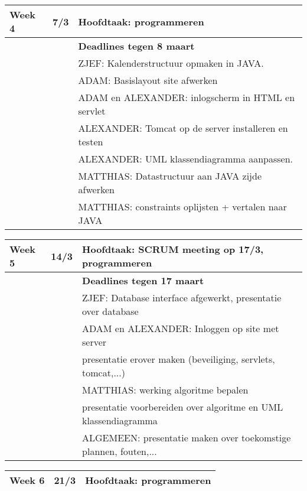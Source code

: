 \documentclass{article}
\begin{document}
\begin{center}
\begin{tabular}[t]{|p{1.3cm}|p{0.8cm}|p{9cm}|}
\hline
Week 4	& 7/3 &	\textbf{Hoofdtaak:} programmeren \\
\hline
 & & \textbf{Deadlines tegen 8 maart} \\
 & & ZJEF:  Kalenderstructuur opmaken in JAVA. \\
 & & ADAM: Basislayout site afwerken \\
 & & ADAM en ALEXANDER: inlogscherm in HTML en servlet  \\
 & & ALEXANDER:  Tomcat op de server installeren en testen \\
 & & ALEXANDER: UML klassendiagramma aanpassen.  \\
 & & MATTHIAS: Datastructuur aan JAVA zijde afwerken \\
 & & MATTHIAS: constraints oplijsten + vertalen naar JAVA \\
\hline
\end{tabular}
 
\begin{tabular}[t]{|p{1.3cm}|p{0.8cm}|p{9cm}|}
\hline
Week 5	& 14/3 & \textbf{	Hoofdtaak:} SCRUM meeting op 17/3, programmeren\\
\hline
 & & \textbf{Deadlines tegen 17 maart} \\
 & & ZJEF: Database interface afgewerkt, presentatie over database \\
 & & ADAM en ALEXANDER:  Inloggen op site met server \\
 & & presentatie erover maken (beveiliging, servlets, tomcat,...) \\
 & & MATTHIAS: werking algoritme bepalen \\
 & & presentatie voorbereiden over algoritme en UML klassendiagramma \\
 & & ALGEMEEN: presentatie maken over toekomstige plannen, fouten,... \\
 \hline
 \end{tabular}
 
\begin{tabular}[t]{|p{1.3cm}|p{0.8cm}|p{9cm}|}
 \hline
Week 6	& 21/3 &	\textbf{Hoofdtaak:} programmeren \\
\hline
\end{tabular}


\end{center}
\end{document}
